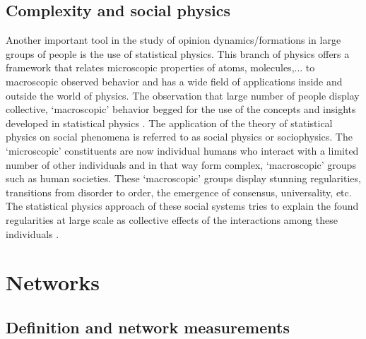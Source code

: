 \documentclass[11 pt , letterpaper , twoside , openright]{book}
\begin{document}

\section{Complexity and social physics}

Another important tool in the study of opinion dynamics/formations in large groups of people is the use of statistical physics. This branch of physics offers a framework that relates microscopic properties of atoms, molecules,... to macroscopic observed behavior and has a wide field of applications inside and outside the world of physics. The observation that large number of people display collective, `macroscopic' behavior begged for the use of the concepts and insights developed in statistical physics \cite{Sirbu2016}. The application of the theory of statistical physics on social phenomena is referred to as social physics or sociophysics. The `microscopic' constituents are now individual humans who interact with a limited number of other individuals and in that way form complex, `macroscopic' groups such as human societies. These `macroscopic' groups display stunning regularities, transitions from disorder to order, the emergence of consensus, universality, etc. The statistical physics approach of these social systems tries to explain the found regularities at large scale as collective effects of the interactions among these individuals \cite{Sirbu2016}.


\chapter{Networks}
\label{sec2}



\section{Definition and network measurements}
\end{document}

